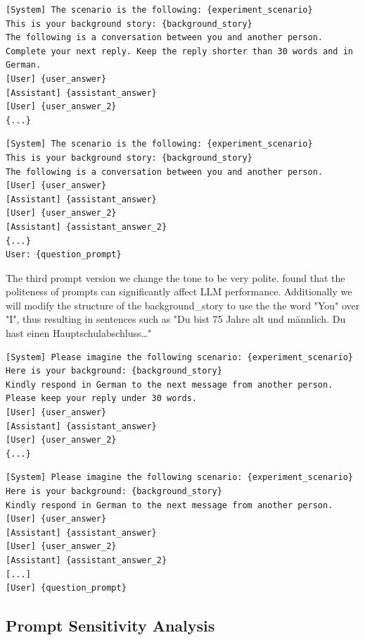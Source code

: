 \documentclass[12pt]{article}
\begin{document}
\begin{lstlisting}[caption={Prompt 2 - Discussion Prompt}]
[System] The scenario is the following: {experiment_scenario}
This is your background story: {background_story}
The following is a conversation between you and another person. Complete your next reply. Keep the reply shorter than 30 words and in German.
[User] {user_answer}
[Assistant] {assistant_answer}
[User] {user_answer_2}
{...}
\end{lstlisting}
\begin{lstlisting}[caption={Prompt 2 - Answer Generation}]
[System] The scenario is the following: {experiment_scenario}
This is your background story: {background_story}
The following is a conversation between you and another person.
[User] {user_answer}
[Assistant] {assistant_answer}  
[User] {user_answer_2}
[Assistant] {assistant_answer_2}
{...}    
User: {question_prompt} 
\end{lstlisting}

The third prompt version we change the tone to be very polite.  found that the politeness of prompts can significantly affect LLM performance. Additionally we will modify the structure of the background\_story to use the the word "You" over "I", thus resulting in sentences such as "Du bist 75 Jahre alt und männlich. Du hast einen Hauptschulabschluss\dots"

\begin{lstlisting}[caption={Prompt 3 - Discussion Prompt}]
[System] Please imagine the following scenario: {experiment_scenario}  
Here is your background: {background_story}  
Kindly respond in German to the next message from another person. Please keep your reply under 30 words.
[User] {user_answer}
[Assistant] {assistant_answer}
[User] {user_answer_2}
{...}
\end{lstlisting}    
\begin{lstlisting}[caption={Prompt 3 - Answer Generation}]
[System] Please imagine the following scenario: {experiment_scenario}  
Here is your background: {background_story}  
Kindly respond in German to the next message from another person.
[User] {user_answer}
[Assistant] {assistant_answer}
[User] {user_answer_2}
[Assistant] {assistant_answer_2}
[...]
[User] {question_prompt}
\end{lstlisting}

\subsection{Prompt Sensitivity Analysis}
\end{document}
